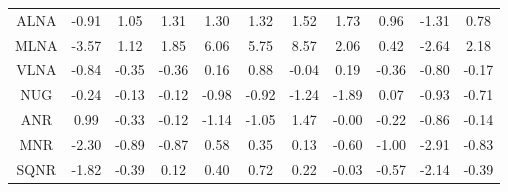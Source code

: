 \documentclass[11pt,a4paper]{report}
\begin{document}
\begin{longtable}{ | c || c | c | c | c | c | c | c | c | c || c |}
ALNA &  \cellcolor[HTML]{FFE7E7} -0.91 &  \cellcolor[HTML]{E7E7FF} 1.05 &  \cellcolor[HTML]{DFDFFF} 1.31 &  \cellcolor[HTML]{DFDFFF} 1.30 &  \cellcolor[HTML]{DFDFFF} 1.32 &  \cellcolor[HTML]{D7D7FF} 1.52 &  \cellcolor[HTML]{D7D7FF} 1.73 &  \cellcolor[HTML]{E7E7FF} 0.96 &  \cellcolor[HTML]{FFDFDF} -1.31 &  \cellcolor[HTML]{EFEFFF} 0.78 \\
MLNA &  \cellcolor[HTML]{FFA7A7} -3.57 &  \cellcolor[HTML]{DFDFFF} 1.12 &  \cellcolor[HTML]{CFCFFF} 1.85 &  \cellcolor[HTML]{6868FF} 6.06 &  \cellcolor[HTML]{7070FF} 5.75 &  \cellcolor[HTML]{2828FF} 8.57 &  \cellcolor[HTML]{CFCFFF} 2.06 &  \cellcolor[HTML]{F7F7FF} 0.42 &  \cellcolor[HTML]{FFBFBF} -2.64 &  \cellcolor[HTML]{C7C7FF} 2.18 \\
VLNA &  \cellcolor[HTML]{FFE7E7} -0.84 &  \cellcolor[HTML]{FFF7F7} -0.35 &  \cellcolor[HTML]{FFF7F7} -0.36 &  \cellcolor[HTML]{F7F7FF} 0.16 &  \cellcolor[HTML]{E7E7FF} 0.88 &  \cellcolor[HTML]{FFFFFF} -0.04 &  \cellcolor[HTML]{F7F7FF} 0.19 &  \cellcolor[HTML]{FFF7F7} -0.36 &  \cellcolor[HTML]{FFE7E7} -0.80 &  \cellcolor[HTML]{FFF7F7} -0.17 \\
NUG &  \cellcolor[HTML]{FFF7F7} -0.24 &  \cellcolor[HTML]{FFFFFF} -0.13 &  \cellcolor[HTML]{FFFFFF} -0.12 &  \cellcolor[HTML]{FFE7E7} -0.98 &  \cellcolor[HTML]{FFE7E7} -0.92 &  \cellcolor[HTML]{FFDFDF} -1.24 &  \cellcolor[HTML]{FFCFCF} -1.89 &  \cellcolor[HTML]{FFFFFF} 0.07 &  \cellcolor[HTML]{FFE7E7} -0.93 &  \cellcolor[HTML]{FFEFEF} -0.71 \\
ANR &  \cellcolor[HTML]{E7E7FF} 0.99 &  \cellcolor[HTML]{FFF7F7} -0.33 &  \cellcolor[HTML]{FFFFFF} -0.12 &  \cellcolor[HTML]{FFDFDF} -1.14 &  \cellcolor[HTML]{FFE7E7} -1.05 &  \cellcolor[HTML]{D7D7FF} 1.47 &  \cellcolor[HTML]{FFFFFF} -0.00 &  \cellcolor[HTML]{FFF7F7} -0.22 &  \cellcolor[HTML]{FFE7E7} -0.86 &  \cellcolor[HTML]{FFFFFF} -0.14 \\
MNR &  \cellcolor[HTML]{FFC7C7} -2.30 &  \cellcolor[HTML]{FFE7E7} -0.89 &  \cellcolor[HTML]{FFE7E7} -0.87 &  \cellcolor[HTML]{EFEFFF} 0.58 &  \cellcolor[HTML]{F7F7FF} 0.35 &  \cellcolor[HTML]{FFFFFF} 0.13 &  \cellcolor[HTML]{FFEFEF} -0.60 &  \cellcolor[HTML]{FFE7E7} -1.00 &  \cellcolor[HTML]{FFB7B7} -2.91 &  \cellcolor[HTML]{FFE7E7} -0.83 \\
SQNR &  \cellcolor[HTML]{FFCFCF} -1.82 &  \cellcolor[HTML]{FFF7F7} -0.39 &  \cellcolor[HTML]{FFFFFF} 0.12 &  \cellcolor[HTML]{F7F7FF} 0.40 &  \cellcolor[HTML]{EFEFFF} 0.72 &  \cellcolor[HTML]{F7F7FF} 0.22 &  \cellcolor[HTML]{FFFFFF} -0.03 &  \cellcolor[HTML]{FFEFEF} -0.57 &  \cellcolor[HTML]{FFC7C7} -2.14 &  \cellcolor[HTML]{FFF7F7} -0.39 \\

\end{longtable}
\end{document}
